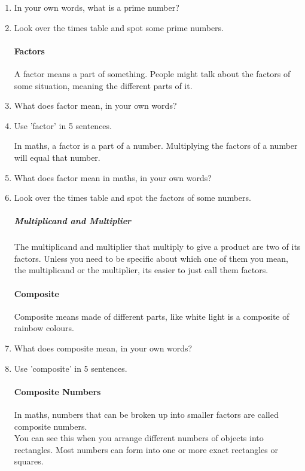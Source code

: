 \documentclass[12pt]{article}
\begin{document}
\begin{enumerate}
\item In your own words, what is a prime number?
\item Look over the times table and spot some prime numbers.

\paragraph{Factors}
A factor means a part of something. People might talk about the factors of some situation, meaning the different parts of it.\\

\item What does factor mean, in your own words?
\item Use 'factor' in 5 sentences.

In maths, a factor is a part of a number. Multiplying the factors of a number will equal that number.

\item What does factor mean in maths, in your own words?
\item Look over the times table and spot the factors of some numbers.

\subparagraph{Multiplicand and Multiplier}
The multiplicand and multiplier that multiply to give a product are two of its factors. Unless you need to be specific about which one of them you mean, the multiplicand or the multiplier, its easier to just call them factors.

\paragraph{Composite}
Composite means made of different parts, like white light is a composite of rainbow colours.\\

\item What does composite mean, in your own words?
\item Use 'composite' in 5 sentences.

\paragraph{Composite Numbers}
In maths, numbers that can be broken up into smaller factors are called composite numbers.\\

You can see this when you arrange different numbers of objects into rectangles. Most numbers can form into one or more exact rectangles or squares.\\


\end{enumerate}
\end{document}

